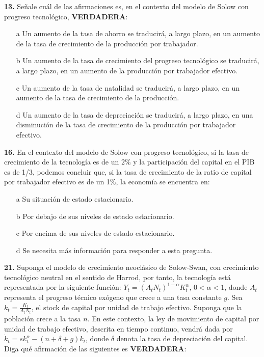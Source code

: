 \documentclass{nuevotema}
\begin{document}

\textbf{13.} Señale cuál de las afirmaciones es, en el contexto del modelo de Solow con progreso tecnológico, \textbf{VERDADERA}:

\begin{itemize}
	\item[a] Un aumento de la tasa de ahorro se traducirá, a largo plazo, en un aumento de la tasa de crecimiento de la producción por trabajador.
	\item[b] Un aumento de la tasa de crecimiento del progreso tecnológico se traducirá, a largo plazo, en un aumento de la producción por trabajador efectivo.
	\item[c] Un aumento de la tasa de natalidad se traducirá, a largo plazo, en un aumento de la tasa de crecimiento de la producción.
	\item[d] Un aumento de la tasa de depreciación se traducirá, a largo plazo, en una disminución de la tasa de crecimiento de la producción por trabajador efectivo.
\end{itemize}

\textbf{16.} En el contexto del modelo de Solow con progreso tecnológico, si la tasa de crecimiento de la tecnología es de un $2\%$ y la participación del capital en el PIB es de 1/3, podemos concluir que, si la tasa de crecimiento de la ratio de capital por trabajador efectivo es de un 1\%, la economía se encuentra en:

\begin{itemize}
	\item[a] Su situación de estado estacionario.
	\item[b] Por debajo de sus niveles de estado estacionario.
	\item[c] Por encima de sus niveles de estado estacionario.
	\item[d] Se necesita más información para responder a esta pregunta.
\end{itemize}


\textbf{21.} Suponga el modelo de crecimiento neoclásico de Solow-Swan, con crecimiento tecnológico neutral en el sentido de Harrod, por tanto, la tecnología está representada por la siguiente función: $Y_t = (A_t N_t)^{1-\alpha} K_t^\alpha$, $0 < \alpha < 1$, donde $A_t$ representa el progreso técnico exógeno que crece a una tasa constante $g$. Sea $k_t = \frac{K_t}{A_t N_t}$, el stock de capital por unidad de trabajo efectivo. Suponga que la población crece a la tasa $n$. En este contexto, la ley de movimiento de capital por unidad de trabajo efectivo, descrita en tiempo continuo, vendrá dada por $\dot{k}_t = s k_t^\alpha - (n+\delta+g) k_t$, donde $\delta$ denota la tasa de depreciación del capital. Diga qué afirmación de las siguientes es \textbf{VERDADERA}:
\end{document}
